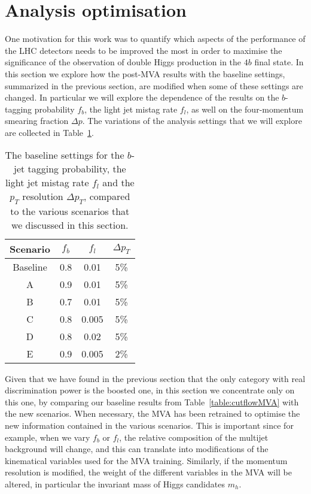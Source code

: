 
\section{Analysis optimisation}
\label{sec:optimisation}

One motivation for this work was to quantify which aspects
of the performance of the LHC detectors needs to be improved
the most in order to maximise the significance of the observation
of double Higgs production in the $4b$ final state.
%
In this section we explore how the post-MVA
results with the baseline settings,
summarized in the previous section, are modified when some of
these settings are changed.
%
In particular we will explore the dependence of the results on
the $b$-tagging probability $f_b$, the light jet mistag rate
$f_l$, as well on the four-momentum smearing fraction $\Delta p$.
%
The variations of the analysis
settings that we will explore are collected in
Table~\ref{sec:variations}.

\begin{table}[h]
  \centering
  \begin{tabular}{|c|c|c|c|}
\hline
    Scenario  &  $f_b$  &  $f_l$  &  $\Delta p_T$ \\
    \hline
    \hline
    Baseline  &  0.8   &   0.01  &  5\% \\
    \hline
    A        &  0.9   &   0.01  &  5\% \\
    B        &  0.7   &   0.01  &  5\% \\
    C        &  0.8   &   0.005  &  5\% \\
    D        &  0.8   &   0.02  &  5\% \\
    E        &  0.9   &   0.005  &  2\% \\   
    \hline
  \end{tabular}
  \caption{\small The baseline settings for the $b$-jet
    tagging probability, the light jet mistag rate $f_l$
    and the $p_T$ resolution $\Delta p_T$, compared
    to the various scenarios that we discussed in this section.
\label{sec:variations}
  }
  \end{table}


Given that we have found in the previous section that the
only category with real discrimination power is the boosted one,
in this section we concentrate only on this one,
by comparing our baseline results from Table~\ref{table:cutflowMVA}
with the new scenarios.
%
When necessary, the MVA has been retrained to optimise the
new information contained in the various scenarios.
%
This is important since for example, when we vary $f_b$
or $f_l$, the relative composition of the multijet
background will change, and this can translate into
modifications of the kinematical variables used for
the MVA training.
%
Similarly, if the momentum resolution is modified,
the weight of the different variables in the MVA
will be altered, in particular the invariant mass
of Higgs candidates $m_h$.


